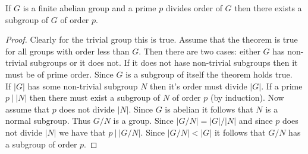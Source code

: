 \begin{theorem}
  If $G$ is a finite abelian group and a prime $p$ divides order of $G$ then there exists a subgroup of $G$ of order $p$.
\end{theorem}
\begin{proof}
  Clearly for the trivial group this is true. Assume that the theorem is true for all groups with order less than $G$. Then there are two cases: either $G$ has non-trivial subgroups or it does not. If it does not hase non-trivial subgroups then it must be of prime order. Since $G$ is a subgroup of itself the theorem holds true.\\

  If $|G|$ has some non-trivial subgroup $N$ then it's order must divide $|G|$. If a prime $p\ |\ |N|$ then there must exist a subgroup of $N$ of order $p$ (by induction). Now assume that $p$ does not divide $|N|$. Since $G$ is abelian it follows that $N$ is a normal subgroup. Thus $G/N$ is a group. Since $|G/N| = |G|/|N|$ and since $p$ does not divide $|N|$ we have that $p\ |\ |G/N|$. Since $|G/N|< |G|$ it follows that $G/N$ has a subgroup of order $p$.
\end{proof}
